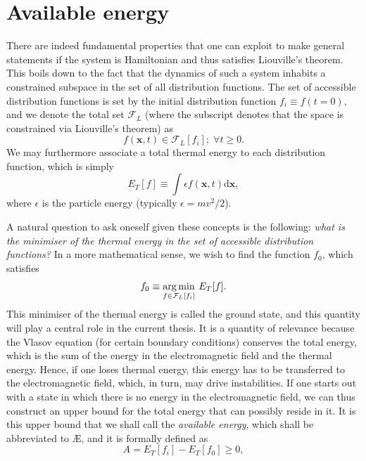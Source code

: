 \section{Available energy}
There are indeed fundamental properties that one can exploit to make general statements if the system is Hamiltonian and thus satisfies Liouville's theorem. This boils down to the fact that the dynamics of such a system inhabits a constrained subspace in the set of all distribution functions. The set of accessible distribution functions is set by the initial distribution function $f_i \equiv f(t=0)$, and we denote the total set $\mathcal{F}_L$ (where the subscript denotes that the space is constrained via Liouville's theorem) as
\begin{equation}
    f(\boldsymbol{x},t) \in \mathcal{F}_L [f_i]; \; \forall t \geq 0.
    \label{eq:set-of-all-distribution-functions}
\end{equation}
We may furthermore associate a total thermal energy to each distribution function, which is simply
\begin{equation}
    E_T[f] \equiv \int \epsilon f(\boldsymbol{x},t) \mathrm{d} \boldsymbol{x},
\end{equation}
where $\epsilon$ is the particle energy (typically $\epsilon=mv^2/2$).\par 
A natural question to ask oneself given these concepts is the following: \textit{what is the minimiser of the thermal energy in the set of accessible distribution functions?} In a more mathematical sense, we wish to find the function $f_0$, which satisfies
\begin{equation}
    f_0 \equiv \operatorname*{arg\,min}_{f \in \mathcal{F}_L[f_i]} \:  E_T[f].
\end{equation}
This minimiser of the thermal energy is called the ground state, and this quantity will play a central role in the current thesis. It is a quantity of relevance because the Vlasov equation (for certain boundary conditions) conserves the total energy, which is the sum of the energy in the electromagnetic field and the thermal energy. Hence, if one loses thermal energy, this energy has to be transferred to the electromagnetic field, which, in turn, may drive instabilities. If one starts out with a state in which there is no energy in the electromagnetic field, we can thus construct an upper bound for the total energy that can possibly reside in it. It is this upper bound that we shall call the \textit{available energy}, which shall be abbreviated to \AE{}, and it is formally defined as
\begin{equation}
    A = E_T[f_i] - E_T[f_0] \geq 0,
\end{equation}
